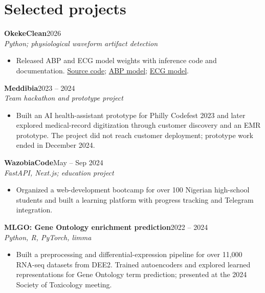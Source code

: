 \documentclass[11pt,letterpaper]{article}
\newcommand{\role}[3]{\textbf{#1}\hfill #2\\\textit{#3}\par}
\begin{document}
\section{Selected projects}
\role{OkekeClean}{2026}{Python; physiological waveform artifact detection}
\begin{itemize}
\item Released ABP and ECG model weights with inference code and documentation. \href{https://github.com/moberg-analytics/oss-models}{Source code}; \href{https://huggingface.co/moberg-analytics/okekeclean-abp}{ABP model}; \href{https://huggingface.co/moberg-analytics/okekeclean-ecg}{ECG model}.
\end{itemize}
\role{Meddibia}{2023 -- 2024}{Team hackathon and prototype project}
\begin{itemize}
\item Built an AI health-assistant prototype for Philly Codefest 2023 and later explored medical-record digitization through customer discovery and an EMR prototype. The project did not reach customer deployment; prototype work ended in December 2024.
\end{itemize}
\role{WazobiaCode}{May -- Sep 2024}{FastAPI, Next.js; education project}
\begin{itemize}
\item Organized a web-development bootcamp for over 100 Nigerian high-school students and built a learning platform with progress tracking and Telegram integration.
\end{itemize}
\role{MLGO: Gene Ontology enrichment prediction}{2022 -- 2024}{Python, R, PyTorch, limma}
\begin{itemize}
\item Built a preprocessing and differential-expression pipeline for over 11,000 RNA-seq datasets from DEE2. Trained autoencoders and explored learned representations for Gene Ontology term prediction; presented at the 2024 Society of Toxicology meeting.
\end{itemize}

\newpage
\end{document}
